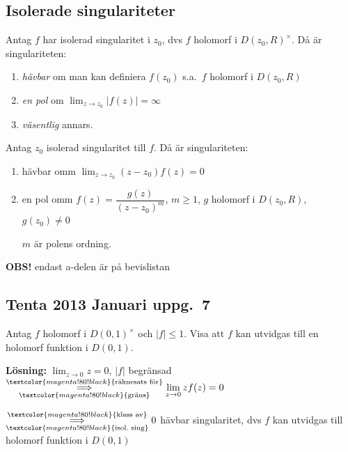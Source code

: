 \subsection{Isolerade singulariteter}
\begin{definition}
Antag $f$ har isolerad singularitet i $z_0$, dvs $f$ holomorf i $D(z_0, R)^\times$. Då är singulariteten:
\begin{enumerate}[label=\textcolor{magenta!80!black}{\roman*)}]
  \item \emph{hävbar} om man kan definiera $f(z_0)$ s.a.\ $f$ holomorf i $D(z_0, R)$
  \item \emph{en pol} om $\displaystyle\lim_{z \to z_0} |f(z)| = \infty$
  \item \emph{väsentlig} annars.
\end{enumerate}
\end{definition}

\begin{theorem}
Antag $z_0$ isolerad singularitet till $f$. Då är singulariteten:
\begin{enumerate}[label=\textcolor{blue!60!black}{\alph*)}]
  \item hävbar omm $\displaystyle\lim_{z \to z_0} (z - z_0)f(z) = 0$
  \item en pol omm $f(z) = \dfrac{g(z)}{(z - z_0)^m}$, $m \ge 1$, $g$ holomorf i $D(z_0, R)$, $g(z_0) \neq 0$

  $m$ är polens ordning.
\end{enumerate}
\end{theorem}

\textcolor{red!70!black}{\textbf{OBS!}} endast a-delen är på bevislistan

\subsection{Tenta 2013 Januari uppg.\ 7}
Antag $f$ holomorf i $D(0, 1)^\times$ och $|f| \le 1$. Visa att $f$ kan utvidgas till en holomorf funktion i $D(0, 1)$.

\textbf{Lösning:} $\displaystyle\lim_{z \to 0} z = 0$, $|f|$ begränsad $\underset{\textcolor{magenta!80!black}{\text{gräns}}}{\overset{\textcolor{magenta!80!black}{\text{räknesats för}}}{\Longrightarrow}} \displaystyle\lim_{z \to 0} zf(z) = 0$

$\underset{\textcolor{magenta!80!black}{\text{isol.\ sing}}}{\overset{\textcolor{magenta!80!black}{\text{klass av}}}{\Longrightarrow}} 0$ hävbar singularitet, dvs $f$ kan utvidgas till holomorf funktion i $D(0, 1)$

